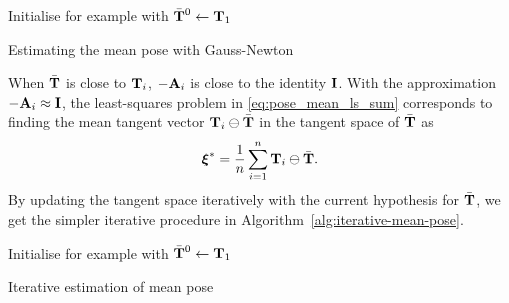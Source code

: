 \begin{example}[frametitle=Estimating the mean of a set of poses]
\begin{algorithm}[H] \label{alg:mean-pose-gauss-newton}
\SetAlgoLined
\DontPrintSemicolon
{}
 \;
 Initialise for example with $\bar{{\boldsymbol{\mathbf{T}}}}^0 \leftarrow {\boldsymbol{\mathbf{T}}}_1$\;
 \;
 \caption{Estimating the mean pose with Gauss-Newton}
\end{algorithm}

When $\bar{{\boldsymbol{\mathbf{T}}}}$ is close to ${\boldsymbol{\mathbf{T}}}_i$, $-{\boldsymbol{\mathbf{A}}}_i$ is close to the identity ${\boldsymbol{\mathbf{I}}}$.
With the approximation $-{\boldsymbol{\mathbf{A}}}_i \approx {\boldsymbol{\mathbf{I}}}$, the least-squares problem in \eqref{eq:pose_mean_ls_sum} corresponds to finding the mean tangent vector ${\boldsymbol{\mathbf{T}}}_i \ominus \bar{{\boldsymbol{\mathbf{T}}}}$ in the tangent space of $\bar{{\boldsymbol{\mathbf{T}}}}$ as
\begin{equation}
  {\boldsymbol{\mathbf{\xi}}}^\ast = \frac{1}{n} \sum^n_{i=1} {\boldsymbol{\mathbf{T}}}_i \ominus \bar{{\boldsymbol{\mathbf{T}}}}.
\end{equation}
By updating the tangent space iteratively with the current hypothesis for $\bar{{\boldsymbol{\mathbf{T}}}}$, we get the simpler iterative procedure in Algorithm~\ref{alg:iterative-mean-pose}.


\begin{algorithm}[H] \label{alg:iterative-mean-pose}
\SetAlgoLined
\DontPrintSemicolon
{}
 \;
 Initialise for example with $\bar{{\boldsymbol{\mathbf{T}}}}^0 \leftarrow {\boldsymbol{\mathbf{T}}}_1$\;
 \;
 \caption{Iterative estimation of mean pose}
\end{algorithm}


\end{example}
